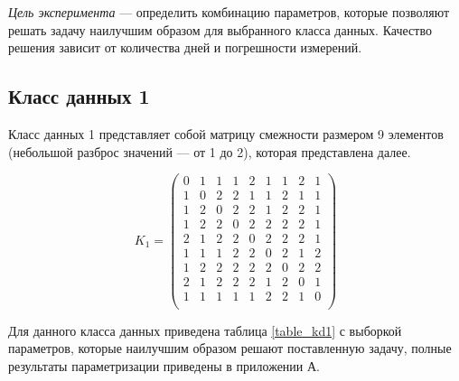 \textit{Цель эксперимента} --- определить комбинацию параметров, которые позволяют решать задачу наилучшим образом для выбранного класса данных. Качество решения зависит от количества дней и погрешности измерений.

\subsection{Класс данных 1}
\label{class1}

Класс данных 1 представляет собой матрицу смежности размером 9 элементов (небольшой разброс значений --- от 1 до 2), которая представлена далее.

\begin{equation}
	K_{1} = \begin{pmatrix}
		0 & 1 & 1 & 1 & 2 & 1 & 1 & 2 & 1 \\
		1 & 0 & 2 & 2 & 1 & 1 & 2 & 1 & 1  \\
		1 & 2 & 0 & 2 & 2 & 1 & 2 & 2 & 1 \\
		1 & 2 & 2 & 0 & 2 & 2 & 2 & 2 & 1 \\
		2 & 1 & 2 & 2 & 0 & 2 & 2 & 2 & 1  \\
		1 & 1 & 1 & 2 & 2 & 0 & 2 & 1 & 2 \\
		1 & 2 & 2 & 2 & 2 & 2 & 0 & 2 & 2 \\
		2 & 1 & 2 & 2 & 2 & 1 & 2 & 0 & 1 \\
		1 & 1 & 1 & 1 & 1 & 2 & 2 & 1 & 0 \\
	\end{pmatrix}
\end{equation}

Для данного класса данных приведена таблица \ref{table_kd1}	с выборкой параметров, которые наилучшим образом решают поставленную задачу, полные результаты параметризации приведены в приложении А.

